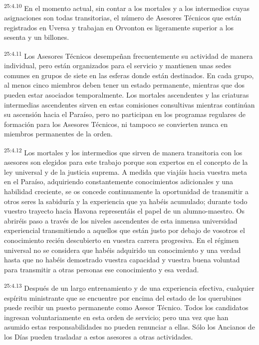 \par
\textsuperscript{25:4.10} En el momento actual, sin contar a los mortales y a los intermedios cuyas asignaciones son todas transitorias, el número de Asesores Técnicos que están registrados en Uversa y trabajan en Orvonton es ligeramente superior a los sesenta y un billones.

\par
\textsuperscript{25:4.11} Los Asesores Técnicos desempeñan frecuentemente su actividad de manera individual, pero están organizados para el servicio y mantienen unas sedes comunes en grupos de siete en las esferas donde están destinados. En cada grupo, al menos cinco miembros deben tener un estado permanente, mientras que dos pueden estar asociados temporalmente. Los mortales ascendentes y las criaturas intermedias ascendentes sirven en estas comisiones consultivas mientras continúan su ascensión hacia el Paraíso, pero no participan en los programas regulares de formación para los Asesores Técnicos, ni tampoco se convierten nunca en miembros permanentes de la orden.

\par
\textsuperscript{25:4.12} Los mortales y los intermedios que sirven de manera transitoria con los asesores son elegidos para este trabajo porque son expertos en el concepto de la ley universal y de la justicia suprema. A medida que viajáis hacia vuestra meta en el Paraíso, adquiriendo constantemente conocimientos adicionales y una habilidad creciente, se os concede continuamente la oportunidad de transmitir a otros seres la sabiduría y la experiencia que ya habéis acumulado; durante todo vuestro trayecto hacia Havona representáis el papel de un alumno-maestro. Os abriréis paso a través de los niveles ascendentes de esta inmensa universidad experiencial transmitiendo a aquellos que están justo por debajo de vosotros el conocimiento recién descubierto en vuestra carrera progresiva. En el régimen universal no se considera que habéis adquirido un conocimiento y una verdad hasta que no habéis demostrado vuestra capacidad y vuestra buena voluntad para transmitir a otras personas ese conocimiento y esa verdad.

\par
\textsuperscript{25:4.13} Después de un largo entrenamiento y de una experiencia efectiva, cualquier espíritu ministrante que se encuentre por encima del estado de los querubines puede recibir un puesto permanente como Asesor Técnico. Todos los candidatos ingresan voluntariamente en esta orden de servicio; pero una vez que han asumido estas responsabilidades no pueden renunciar a ellas. Sólo los Ancianos de los Días pueden trasladar a estos asesores a otras actividades.

